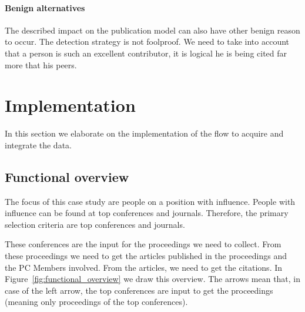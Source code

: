 \documentclass{ou-report}
\begin{document}

\paragraph{Benign alternatives}
The described impact on the publication model can also have other benign reason 
to occur. The detection strategy is not foolproof. We need to take into account 
that a person is such an excellent contributor, it is logical he is being cited
far more that his peers.

\section{Implementation}
In this section we elaborate on the implementation of the flow to acquire and
integrate the data.

\subsection{Functional overview}

The focus of this case study are people on a position with influence.
People with influence can be found at top conferences and journals.
Therefore, the primary selection criteria are top conferences and journals.

These conferences are the input for the proceedings we need to collect. From 
these proceedings we need to get the articles published in the proceedings and
the PC Members involved. From the articles, we need to get the citations.
In Figure~\ref{fig:functional_overview} we draw this overview. The arrows mean
that, in case of the left arrow, the top conferences are input to get the 
proceedings (meaning only proceedings of the top conferences).
\end{document}
